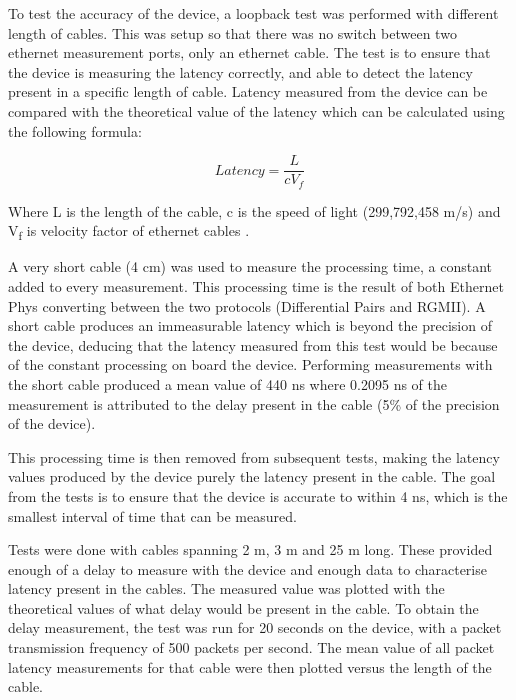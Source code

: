 To test the accuracy of the device, a loopback test was performed with different length of cables. This was setup so 
that there was no switch between two ethernet measurement ports, only an ethernet cable. The test is to ensure that 
the device is measuring the latency correctly, and able to detect the latency present in a specific length of cable. 
Latency measured from the device can be compared with the theoretical value of the latency which can be calculated 
using the following formula:

\[ Latency = \frac{L}{cV_f} \] 

Where L is the length of the cable, c is the speed of light (299,792,458 m/s) and V\textsubscript{f} is velocity 
factor of ethernet cables \cite{VelFactor}.

A very short cable (4 cm) was used to measure the processing time, a constant added to every measurement. This 
processing time is the result of both Ethernet Phys converting between the two protocols (Differential Pairs and 
RGMII). A short cable produces an immeasurable latency which is beyond the precision of the device, deducing that 
the latency measured from this test would be because of the constant processing on board the device. Performing 
measurements with the short cable produced a mean value of 440 ns where 0.2095 ns of the measurement is attributed 
to the delay present in the cable (5\% of the precision of the device). 

This processing time is then removed from subsequent tests, making the latency values produced by the device purely 
the latency present in the cable. The goal from the tests is to ensure that the device is accurate to within 4 ns, 
which is the smallest interval of time that can be measured. 

Tests were done with cables spanning 2 m, 3 m and 25 m long. These provided enough of a delay to measure with the 
device and enough data to characterise latency present in the cables. The measured value was plotted with the 
theoretical values of what delay would be present in the cable. To obtain the delay measurement, the test was run 
for 20 seconds on the device, with a packet transmission frequency of 500 packets per second. The mean value of all 
packet latency measurements for that cable were then plotted versus the length of the cable.

